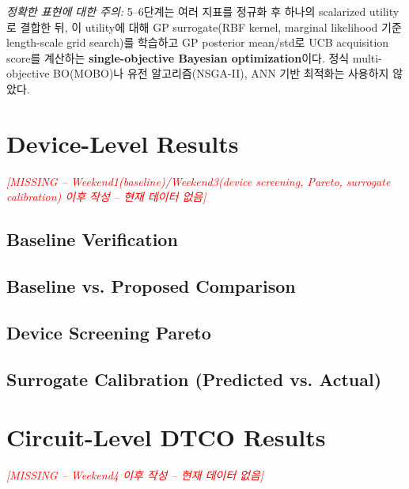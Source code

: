 \documentclass[journal]{IEEEtran}
\newcommand{\missing}[1]{\textcolor{red}{\textit{[MISSING -- #1]}}}
\begin{document}
\emph{정확한 표현에 대한 주의:} 5--6단계는 여러 지표를 정규화 후 하나의 scalarized utility로 결합한 뒤, 이 utility에 대해 GP surrogate(RBF kernel, marginal likelihood 기준 length-scale grid search)를 학습하고 GP posterior mean/std로 UCB acquisition score를 계산하는 \textbf{single-objective Bayesian optimization}이다. 정식 multi-objective BO(MOBO)나 유전 알고리즘(NSGA-II), ANN 기반 최적화는 사용하지 않았다.

\section{Device-Level Results}
\label{sec:device-results}

\missing{Weekend1(baseline)/Weekend3(device screening, Pareto, surrogate calibration) 이후 작성 -- 현재 데이터 없음}

\subsection{Baseline Verification}

\subsection{Baseline vs. Proposed Comparison}

\subsection{Device Screening Pareto}

\subsection{Surrogate Calibration (Predicted vs. Actual)}

\section{Circuit-Level DTCO Results}
\label{sec:circuit-results}

\missing{Weekend4 이후 작성 -- 현재 데이터 없음}
\end{document}
